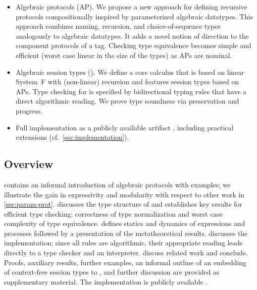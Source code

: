 \begin{itemize}
\item Algebraic protocols (AP). We propose a new approach for defining
  recursive protocols compositionally inspired by parameterized algebraic
  datatypes. This approach combines naming, recursion, and
  choice-of-sequence types analogously to algebraic
  datatypes. It adds a novel notion of direction to the component
  protocols of a tag. Checking type equivalence becomes simple and efficient
  (worst case linear in the size of the types) as APs are nominal. 
\item Algebraic session types (\algst). We define a core calculus that is based
  on linear System~F with (non-linear) recursion and features session types
  based on APs. Type checking for \algst is specified by bidirectional typing
  rules that have a direct algorithmic reading.
  We prove type soundness via preservation and
  progress.%
\item Full implementation as a publicly available artifact
  \cite{artifact}, including practical extensions (cf.\ \cref{sec:implementation}).
\end{itemize}

\subsection*{Overview}
\label{sec:overview}

 contains an informal introduction of algebraic
protocols with examples; we illustrate the gain in
expressivity and modularity with respect to other work in
\cref{sec:param-prot}.  discusses the type structure
of \algst and establishes key results for efficient type checking: correctness of type normalization and
worst case complexity of type equivalence.  defines
statics and dynamics of expressions 
and processes %
followed by a presentation of the metatheoretical results.
 discusses the implementation; since all rules are
algorithmic, their appropriate reading leads directly to a type checker and an interpreter.
 discuss related work and conclude.
%
Proofs, auxiliary results, further examples, an informal outline of an embedding
of context-free session types to \algst, and further discussion are provided as supplementary material. The
implementation is publicly available \cite{artifact}.

